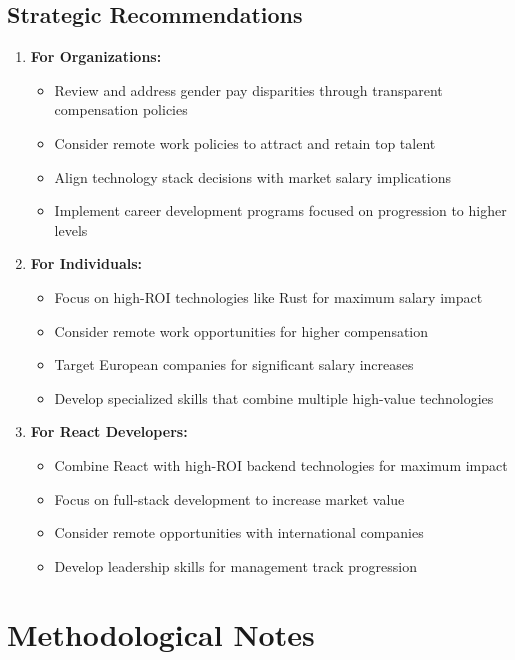 \documentclass[12pt,a4paper]{article}
\begin{document}
\subsection{Strategic Recommendations}
\begin{enumerate}
    \item \textbf{For Organizations:}
    \begin{itemize}
        \item Review and address gender pay disparities through transparent compensation policies
        \item Consider remote work policies to attract and retain top talent
        \item Align technology stack decisions with market salary implications
        \item Implement career development programs focused on progression to higher levels
    \end{itemize}
    
    \item \textbf{For Individuals:}
    \begin{itemize}
        \item Focus on high-ROI technologies like Rust for maximum salary impact
        \item Consider remote work opportunities for higher compensation
        \item Target European companies for significant salary increases
        \item Develop specialized skills that combine multiple high-value technologies
    \end{itemize}
    
    \item \textbf{For React Developers:}
    \begin{itemize}
        \item Combine React with high-ROI backend technologies for maximum impact
        \item Focus on full-stack development to increase market value
        \item Consider remote opportunities with international companies
        \item Develop leadership skills for management track progression
    \end{itemize}
\end{enumerate}

\section{Methodological Notes}
\end{document}

